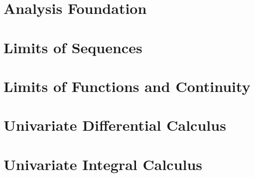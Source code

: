 \documentclass{report}
\begin{document}
	
	\thispagestyle{empty}
	\newpage%
	\tableofcontents
  

  \chapter{Analysis Foundation}
  
  \newpage
  \chapter{Limits of Sequences}
  
  \newpage
  \chapter{Limits of Functions and Continuity}
  
  \newpage
  \chapter{Univariate Differential Calculus}
  
  \newpage
  \chapter{Univariate Integral Calculus}
  



  
\end{document}

